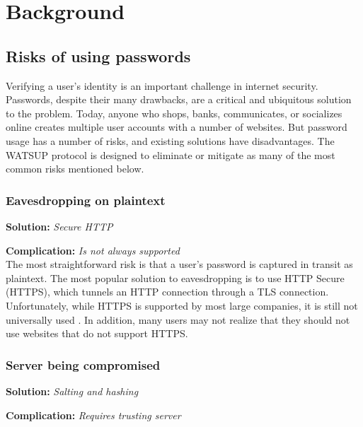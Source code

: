 \section{Background}
\label{sec:background}

\subsection{Risks of using passwords}

Verifying a user's identity is an important challenge in internet security. Passwords, despite their many drawbacks, are a critical and ubiquitous solution to the problem. Today, anyone who shops, banks, communicates, or socializes online creates multiple user accounts with a number of websites. But password usage has a number of risks, and existing solutions have disadvantages. The WATSUP protocol is designed to eliminate or mitigate as many of the most common risks mentioned below.


\subsubsection{Eavesdropping on plaintext}

\textbf{Solution:} \emph{Secure HTTP}

\noindent\textbf{Complication:} \emph{Is not always supported}\\

\noindent The most straightforward risk is that a user's password is captured in transit as plaintext. The most popular solution to eavesdropping is to use HTTP Secure (HTTPS), which tunnels an HTTP connection through a TLS connection. Unfortunately, while HTTPS is supported by most large companies, it is still not universally used \cite{Aas:2016}. In addition, many users may not realize that they should not use websites that do not support HTTPS.


\subsubsection{Server being compromised}

\textbf{Solution:} \emph{Salting and hashing}

\noindent\textbf{Complication:} \emph{Requires trusting server}\\

